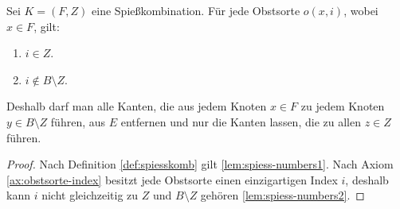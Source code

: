 \begin{lemma} \label{lem:spiess-numbers}
Sei $K = (F, Z)$ eine Spießkombination. Für jede Obstsorte $o(x, i)$, wobei $x \in F$, gilt:
\begin{enumerate}[label={\upshape(\roman*)}]
  \item $i \in Z$. \label{lem:spiess-numbers1}
  \item $i \notin B \setminus Z$. \label{lem:spiess-numbers2}
\end{enumerate}   
Deshalb darf man alle Kanten, die aus jedem Knoten $x \in F$ 
zu jedem Knoten $y \in B \setminus Z$ führen, aus $E$ entfernen und nur die Kanten lassen, die
zu allen $z \in Z$ führen.
\end{lemma}

\begin{proof}
Nach Definition \ref{def:spiesskomb} gilt \ref{lem:spiess-numbers1}. 
Nach Axiom \ref{ax:obstsorte-index} besitzt jede Obstsorte einen einzigartigen Index $i$,
deshalb kann $i$ nicht gleichzeitig zu $Z$ und $B \setminus Z$ gehören \ref{lem:spiess-numbers2}.
\end{proof}